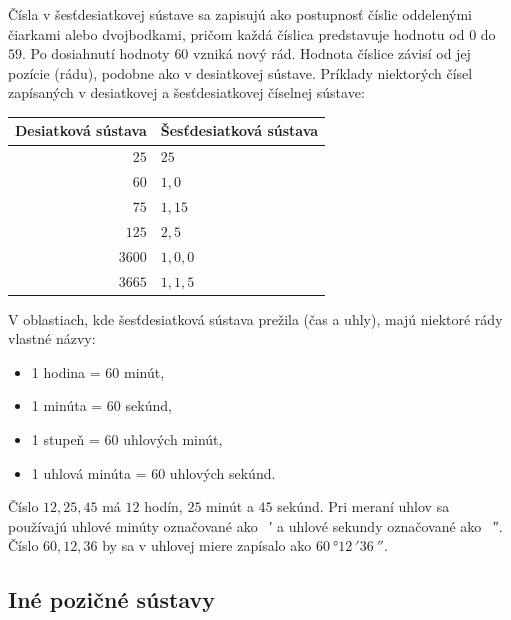 \documentclass{article}
\begin{document}
Čísla v šesťdesiatkovej sústave sa zapisujú ako postupnosť číslic oddelenými čiarkami alebo dvojbodkami, pričom každá číslica predstavuje hodnotu od \(0\) do \(59\). Po dosiahnutí hodnoty \(60\) vzniká nový rád. Hodnota číslice závisí od jej pozície (rádu), podobne ako v desiatkovej sústave. Príklady niektorých čísel zapísaných v desiatkovej a šesťdesiatkovej číselnej sústave:
\begin{center}
\begin{tabular}{r|l}

\textbf{Desiatková sústava} & \textbf{Šesťdesiatková sústava} \\
\hline
\(25\) & \(25\) \\

\(60\) & \(1,0\)  \\

\(75\) & \(1,15\)  \\

\(125\) & \(2,5\) \\

\(3600\) & \(1,0,0\)  \\

\(3665\) & \(1,1,5\)  \\

\end{tabular}
\end{center}

V oblastiach, kde šesťdesiatková sústava prežila (čas a uhly), majú niektoré rády vlastné názvy:
\begin{itemize}
  \item 1 hodina = 60 minút,
  \item 1 minúta = 60 sekúnd,
  \item 1 stupeň = 60 uhlových minút,
  \item 1 uhlová minúta = 60 uhlových sekúnd.
\end{itemize}
Číslo \(12, 25, 45\) má \(12\) hodín, \(25\) minút a \(45\) sekúnd. Pri meraní uhlov sa používajú uhlové minúty označované ako \SI{}{\arcminute} a uhlové sekundy označované ako \SI{}{\arcsecond}. Číslo \(60, 12, 36\) by sa v uhlovej miere zapísalo ako \(\SI{60}{\degree} \SI{12}{\arcminute} \SI{36}{\arcsecond}\).

\subsection{Iné pozičné sústavy}
\end{document}
